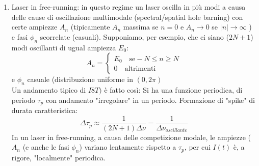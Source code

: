 \documentclass{book}
\def \D {\Delta}
\theoremstyle{remark}
\begin{document}
\begin{enumerate}
\item Laser in free-running: in questo regime un laser oscilla in più modi a causa delle cause di oscillazione multimodale (spectral/spatial hole barning) con certe ampiezze $A_n$ (tipicamente $A_n$ massima se $n=0$ e $A_n\rightarrow 0$ se $|n| \rightarrow \infty$ ) e fasi $\phi_n$ scorrelate (casuali). Supponiamo, per esempio, che ci siano ($2N+1$) modi oscillanti di ugual ampiezza $E_0$:
\begin{equation*}
A_n = \begin{cases}
E_0 \quad \text{se} -N\leq n \geq N\\
0 \quad \text{altrimenti}
\end{cases}
\end{equation*}
e $\phi_n$ casuale (distribuzione uniforme in $(0, 2\pi)$\\
Un andamento tipico di $I8T)$ è fatto così:
Si ha una funzione periodica, di periodo $\tau_p$ con andamento "irregolare" in un periodo.
Formazione di "spike" di durata caratteristica:
\begin{equation*}
\D\tau_p \approx \frac{1}{(2N+1)\D\nu} = \frac{1}{\D\nu_{oscillante}}
\end{equation*}
In un laser in free-running, a causa delle competizione modale, le ampiezze ($A_n$ (e anche le fasi $\phi_n$) variano lentamente rispetto a $\tau_p$, per cui $I(t)$ è, a rigore, "localmente" periodica.


\end{enumerate}
\end{document}
